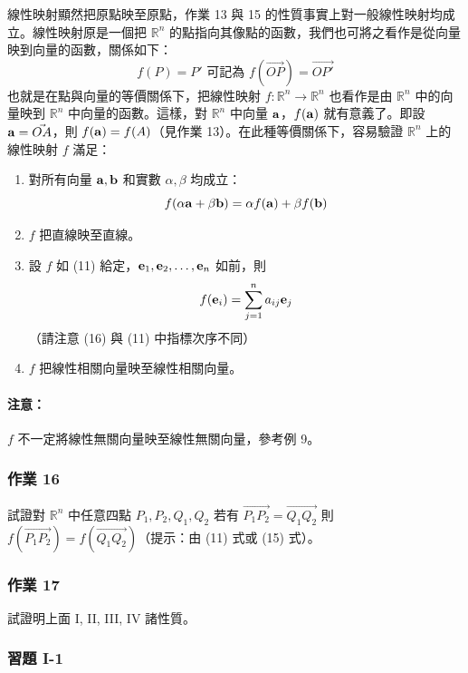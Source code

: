 線性映射顯然把原點映至原點，作業 13 與 15 的性質事實上對一般線性映射均成立。線性映射原是一個把 $\mathbb{R}^n$ 的點指向其像點的函數，我們也可將之看作是從向量映到向量的函數，關係如下：
\[ f(P)=P' \text{ 可記為 } f(\vec{OP}) = \vec{OP'} \]
也就是在點與向量的等價關係下，把線性映射 $f: \mathbb{R}^n \longrightarrow \mathbb{R}^n$ 也看作是由 $\mathbb{R}^n$ 中的向量映到 $\mathbb{R}^n$ 中向量的函數。這樣，對 $\mathbb{R}^n$ 中向量 $\boldsymbol{\mathbf{a}}$，$f(\boldsymbol{\mathbf{a}})$ 就有意義了。即設 $\boldsymbol{\mathbf{a}}=\vec{OA}$，則 $f(\boldsymbol{\mathbf{a}}) = f(A)$（見作業 13）。在此種等價關係下，容易驗證 $\mathbb{R}^n$ 上的線性映射 $f$ 滿足：
\begin{enumerate}[label=\Roman*., leftmargin=2.5em]
  \item 對所有向量 $\boldsymbol{\mathbf{a}}, \boldsymbol{\mathbf{b}}$ 和實數 $\alpha, \beta$ 均成立：
  \begin{equation}
  f(\alpha\boldsymbol{\mathbf{a}} + \beta\boldsymbol{\mathbf{b}}) = \alpha f(\boldsymbol{\mathbf{a}}) + \beta f(\boldsymbol{\mathbf{b}}) \label{eq:b6s-1-1-15}
  \end{equation}
  \item $f$ 把直線映至直線。
  \item 設 $f$ 如 (11) 給定，$\boldsymbol{\mathbf{e}}_1, \boldsymbol{\mathbf{e}}_2, \dots, \boldsymbol{\mathbf{e}}_n$ 如前，則
  \begin{equation}
  f(\boldsymbol{\mathbf{e}}_i) = \sum_{j=1}^n a_{ij} \boldsymbol{\mathbf{e}}_j \label{eq:b6s-1-1-16}
  \end{equation}
  （請注意 (16) 與 (11) 中指標次序不同）
  \item $f$ 把線性相關向量映至線性相關向量。
\end{enumerate}

\paragraph{注意：}$f$ 不一定將線性無關向量映至線性無關向量，參考例 9。

\subsubsection*{作業 16}\label{hw:b6s-1-16}
試證對 $\mathbb{R}^n$ 中任意四點 $P_1, P_2, Q_1, Q_2$ 若有 $\vec{P_1P_2} = \vec{Q_1Q_2}$ 則 $f(\vec{P_1P_2}) = f(\vec{Q_1Q_2})$（提示：由 (11) 式或 (15) 式）。

\subsubsection*{作業 17}\label{hw:b6s-1-17}
試證明上面 I, II, III, IV 諸性質。

\subsubsection*{習題 I-1}\label{sec:b6s-ex1-1}

